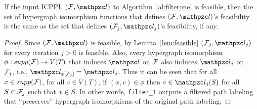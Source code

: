 \begin{lemma}
  \label{lem:noexit1}
  If the input ICPPL $(\cF, \cl)$ to Algorithm~\ref{al:filterone} is
  feasible, then the set of hypergraph isomorphism functions that
  defines $(\cF, \cl)$'s feasibility is the same as the set that
  defines $(\cF_j, \cl_j)$'s feasibility, if any.%
\end{lemma}
\begin{proof}\thesisspacing
  Since $(\cF,\cl)$ is feasible, by Lemma~\ref{lem:feasible}
  $(\cF_j,\cl_j)$ for every iteration $j > 0$ is
  feasible.  %
  Also, every hypergraph isomorphism $\phi: supp({\cal F}) \rightarrow
  V(T)$ that induces $\cl$ on ${\cal F}$ also induces $\cl_{j}$ on
  ${\cal F}_{j}$, i.e., $\cl_{\phi[\cF_j]} = \cl_j$. Thus it can be seen
  that for all $x \in supp({\cal F})$, for all $v \in V(T)$, if $(x,v) \in
  \phi$ then $v \in \cl_{j}(S)$ for all $S \in {\cal F}_{j}$ such that $x
  \in S$.
  In other words, {\tt filter\_1} outputs a filtered path labeling that
  ``preserves''
  hypergraph isomorphisms of the original path labeling.

\end{proof}
